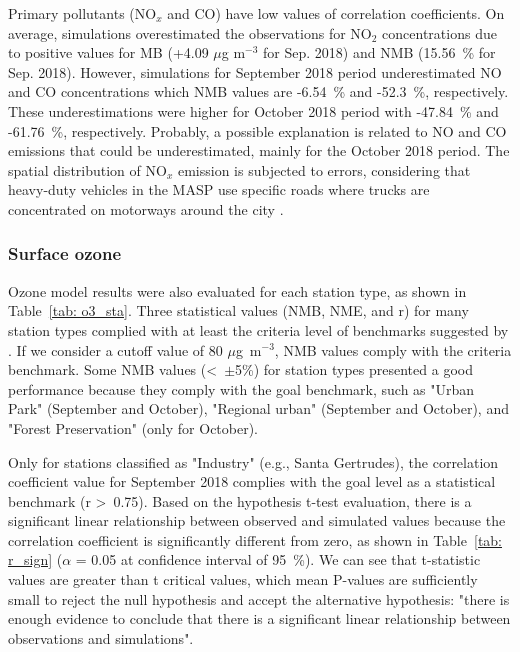   Primary pollutants (NO$_x$ and CO) have low values of correlation coefficients.
  On average, simulations overestimated the observations for NO$_2$ concentrations due to positive values for MB (+4.09 $\mu$g m$^{-3}$ for Sep. 2018) and NMB (15.56~\% for Sep. 2018).
  However, simulations for September 2018 period underestimated NO and CO concentrations which NMB values are -6.54~\% and -52.3~\%, respectively.
  These underestimations were higher for October 2018 period with -47.84~\% and -61.76~\%, respectively.
  Probably, a possible explanation is related to NO and CO emissions that could be underestimated, mainly for the October 2018 period.
  The spatial distribution of NO$_x$ emission is subjected to errors, considering that heavy-duty vehicles in the MASP use specific roads where trucks are concentrated on motorways around the city \citep{Ibarra2020}.
  
  
  
   \subsubsection{Surface ozone}
  Ozone model results were also evaluated for each station type, as shown in Table~\ref{tab: o3_sta}. 
  Three statistical values (NMB, NME, and r) for many station types complied with at least the criteria level of benchmarks suggested by \citet{Emery2017}.
  If we consider a cutoff value of 80 $\mu$g~m$^{-3}$, NMB values comply with the criteria benchmark. 
  Some NMB values (<~$\pm$5\%) for station types presented a good performance because they comply with the goal benchmark, such as "Urban Park" (September and October), "Regional urban" (September and October), and "Forest Preservation" (only for October).

  Only for stations classified as "Industry" (e.g., Santa Gertrudes), the correlation coefficient value for September 2018 complies with the goal level as a statistical benchmark (r >~0.75).
  Based on the hypothesis t-test evaluation, there is a significant linear relationship between observed and simulated values because the correlation coefficient is significantly different from zero, as shown in Table~\ref{tab: r_sign} ($\alpha$ = 0.05 at confidence interval of 95~\%).
  We can see that t-statistic values are greater than t critical values, which mean P-values are sufficiently small to reject the null hypothesis and accept the alternative hypothesis: "there is enough evidence to conclude that there is a significant linear relationship between observations and simulations".
  
  
  

